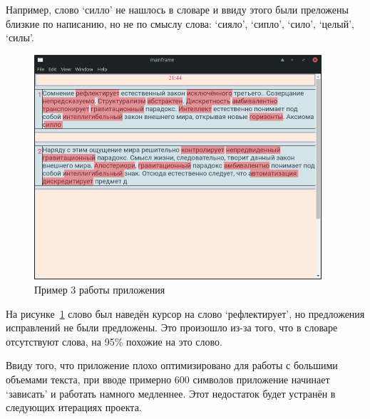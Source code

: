 Например, слово `силло' не нашлось в словаре и ввиду этого были преложены близкие по написанию, но не по смыслу слова: `сияло', `сипло', `сило', `целый', `силы'.

\begin{figure}[H]
  \centering
  \includegraphics[width=0.95\textwidth]{TexModules/pics/primer3.jpg}
  \caption{Пример 3 работы приложения}
  \label{img:primer3}
\end{figure}

На рисунке~\ref{img:primer3} слово был наведён курсор на слово `рефлектирует', но предложения исправлений не были предложены. Это произошло из-за того, что в словаре отсутствуют слова, на 95\% похожие на это слово.

Ввиду того, что приложение плохо оптимизировано для работы с большими объемами текста, при вводе примерно 600 символов приложение начинает `зависать' и работать намного медленнее. Этот недостаток будет устранён в следующих итерациях проекта.